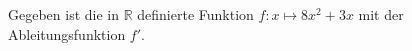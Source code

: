 \documentclass[preview]{standalone}
\begin{document}
\begin{center}
Gegeben ist die in $\mathbb{R}$ definierte Funktion $f: x \mapsto 8x^2 + 3x$ mit der Ableitungsfunktion $f'$.
\end{center}
\end{document}
